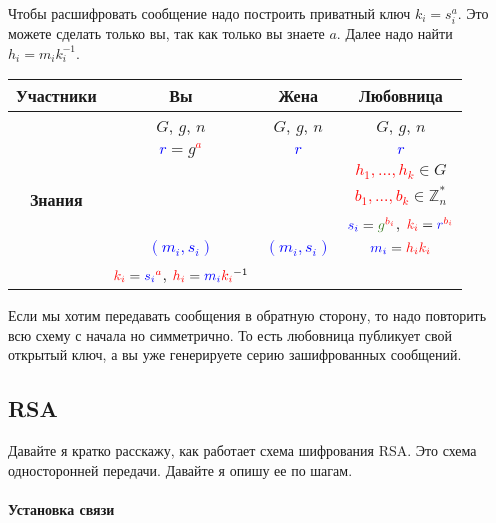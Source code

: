 Чтобы расшифровать сообщение надо построить приватный ключ $k_i = s_i^a$.
Это можете сделать только вы, так как только вы знаете $a$.
Далее надо найти $h_i = m_i k_i^{-1}$.
\begin{center}
\begin{tabular}{|c|c|c|c|}
\hline
{\bf Участники}&{Вы}&{Жена}&{Любовница}\\
\hline
\multirow{7}{*}{\bf Знания}&{\textcolor{OliveGreen}{$G$}, \textcolor{OliveGreen}{$g$}, \textcolor{OliveGreen}{$n$}}&{\textcolor{OliveGreen}{$G$}, \textcolor{OliveGreen}{$g$}, \textcolor{OliveGreen}{$n$}}&{\textcolor{OliveGreen}{$G$}, \textcolor{OliveGreen}{$g$}, \textcolor{OliveGreen}{$n$}}\\
{}&{ \textcolor{blue}{$r$}$=$\textcolor{OliveGreen}{$ g$}\textcolor{red}{${}^a$}}&{\textcolor{blue}{$r$}}&{\textcolor{blue}{$r$}}\\
{}&{}&{}&{\textcolor{red}{$h_1,\ldots,h_k$}$\in G$}\\
{}&{}&{}&{\textcolor{red}{$b_1,\ldots,b_k$}$\in \mathbb Z_n^*$}\\
{}&{}&{}&{$\textcolor{blue}{s_i} = \textcolor{OliveGreen}{g}^{\textcolor{red}{b_i}}$, $\textcolor{red}{k_i} = \textcolor{blue}{r}^{\textcolor{red}{b_i}}$}\\
{}&{\textcolor{blue}{$(m_i, s_i)$}}&{\textcolor{blue}{$(m_i, s_i)$}}&{$\textcolor{blue}{m_i} = \textcolor{red}{h_i k_i}$}\\
{}&{$\textcolor{red}{k_i} = \textcolor{blue}{s_i}^{\textcolor{red}{a}}$, $\textcolor{red}{h_i} = \textcolor{blue}{m_i} \textcolor{red}{k_i}^{-1}$}&{}&{}\\
\hline
\end{tabular}
\end{center}

Если мы хотим передавать сообщения в обратную сторону, то надо повторить всю схему с начала но симметрично.
То есть любовница публикует свой открытый ключ, а вы уже генерируете серию зашифрованных сообщений.

\subsection{RSA}

Давайте я кратко расскажу, как работает схема шифрования RSA.
Это схема односторонней передачи.
Давайте я опишу ее по шагам.

\paragraph{Установка связи}

